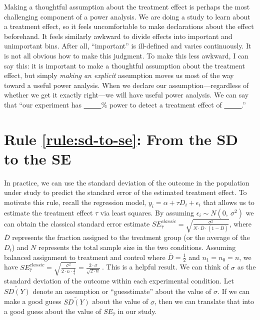 \documentclass[12pt]{article}
\begin{document}
Making a thoughtful assumption about the treatment effect is perhaps the most challenging component of a power analysis. 
We are doing a study to learn about a treatment effect, so it feels uncomfortable to make declarations about the effect beforehand. 
It feels similarly awkward to divide effects into important and unimportant bins. 
After all, ``important'' is ill-defined and varies continuously. It is not all obvious how to make this judgment. 
To make this less awkward, I can say this: it is important to
make a thoughtful assumption about the treatment effect, but simply
\emph{making an explicit} assumption moves us most of the way toward a useful power analysis. 
When we declare our assumption---regardless of whether we get it exactly right---we will have useful power analysis. 
We can say that ``our experiment has \underline{~~~~~}\% power to detect a treatment effect of \underline{~~~~~}.''

\section*{Rule \ref{rule:sd-to-se}: From the SD to the SE}

In practice, we can use the standard deviation of the outcome in the population under study to predict the standard error of the estimated treatment effect. 
To motivate this rule, recall the regression model, $y_{i} = \alpha + \tau D_{i} + \epsilon_{i}$ that allows us to estimate the treatment effect $\tau$ via least squares. 
By assuming $\epsilon_{i} \sim N\left( 0,\ \sigma^{2} \right)$ we can obtain the classical standard error estimate $SE_{\widehat{\tau}}^{classic} = \sqrt{\frac{\sigma^{2}}{N \cdot \overline{D} \cdot \left( 1 - \overline{D} \right)}}$, where $\overline{D}$ represents the fraction assigned to the treatment group (or the average of the $D_{i}$) and $N$ represents the total sample size in the two conditions. 
Assuming balanced assignment to treatment and control where $\overline{D} = \frac{1}{2}$ and $n_{1} = n_{0} = n$, we have $SE_{\widehat{\tau}}^{classic} = \sqrt{\frac{\sigma^{2}}{2 \cdot n \cdot \frac{1}{4}}} = \frac{2 \cdot \sigma}{\sqrt{2 \cdot n}}\ $.
This is a helpful result. 
We can think of $\sigma$ as the standard deviation of the outcome within each experimental condition. 
Let $\widetilde{SD(Y)}$ denote an assumption or ``guesstimate'' about the value of $\sigma$. 
If we can make a good guess $\widetilde{SD(Y)}$ about the value of $\sigma$, then we can translate that into a good guess about the value of $SE_{\widehat{\tau}}$ in our study.
\end{document}

